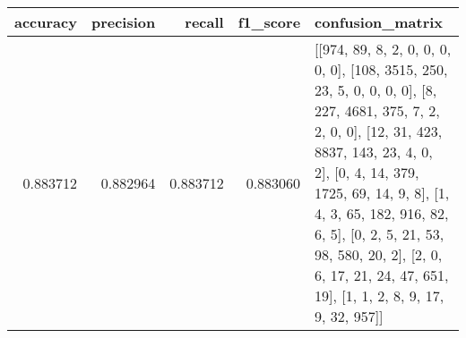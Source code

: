 \begin{tabular}{rrrrl}
\toprule
accuracy & precision & recall & f1_score & confusion_matrix \\
\midrule
0.883712 & 0.882964 & 0.883712 & 0.883060 & [[974, 89, 8, 2, 0, 0, 0, 0, 0], [108, 3515, 250, 23, 5, 0, 0, 0, 0], [8, 227, 4681, 375, 7, 2, 2, 0, 0], [12, 31, 423, 8837, 143, 23, 4, 0, 2], [0, 4, 14, 379, 1725, 69, 14, 9, 8], [1, 4, 3, 65, 182, 916, 82, 6, 5], [0, 2, 5, 21, 53, 98, 580, 20, 2], [2, 0, 6, 17, 21, 24, 47, 651, 19], [1, 1, 2, 8, 9, 17, 9, 32, 957]] \\
\bottomrule
\end{tabular}
